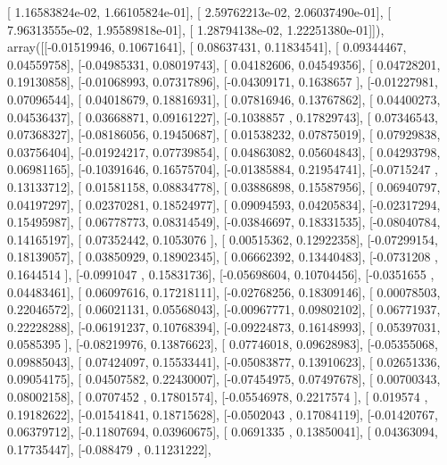 \documentclass{article}
\begin{document}
       [  1.16583824e-02,   1.66105824e-01],
       [  2.59762213e-02,   2.06037490e-01],
       [  7.96313555e-02,   1.95589818e-01],
       [  1.28794138e-02,   1.22251380e-01]]), array([[-0.01519946,  0.10671641],
       [ 0.08637431,  0.11834541],
       [ 0.09344467,  0.04559758],
       [-0.04985331,  0.08019743],
       [ 0.04182606,  0.04549356],
       [ 0.04728201,  0.19130858],
       [-0.01068993,  0.07317896],
       [-0.04309171,  0.1638657 ],
       [-0.01227981,  0.07096544],
       [ 0.04018679,  0.18816931],
       [ 0.07816946,  0.13767862],
       [ 0.04400273,  0.04536437],
       [ 0.03668871,  0.09161227],
       [-0.1038857 ,  0.17829743],
       [ 0.07346543,  0.07368327],
       [-0.08186056,  0.19450687],
       [ 0.01538232,  0.07875019],
       [ 0.07929838,  0.03756404],
       [-0.01924217,  0.07739854],
       [ 0.04863082,  0.05604843],
       [ 0.04293798,  0.06981165],
       [-0.10391646,  0.16575704],
       [-0.01385884,  0.21954741],
       [-0.0715247 ,  0.13133712],
       [ 0.01581158,  0.08834778],
       [ 0.03886898,  0.15587956],
       [ 0.06940797,  0.04197297],
       [ 0.02370281,  0.18524977],
       [ 0.09094593,  0.04205834],
       [-0.02317294,  0.15495987],
       [ 0.06778773,  0.08314549],
       [-0.03846697,  0.18331535],
       [-0.08040784,  0.14165197],
       [ 0.07352442,  0.1053076 ],
       [ 0.00515362,  0.12922358],
       [-0.07299154,  0.18139057],
       [ 0.03850929,  0.18902345],
       [ 0.06662392,  0.13440483],
       [-0.0731208 ,  0.1644514 ],
       [-0.0991047 ,  0.15831736],
       [-0.05698604,  0.10704456],
       [-0.0351655 ,  0.04483461],
       [ 0.06097616,  0.17218111],
       [-0.02768256,  0.18309146],
       [ 0.00078503,  0.22046572],
       [ 0.06021131,  0.05568043],
       [-0.00967771,  0.09802102],
       [ 0.06771937,  0.22228288],
       [-0.06191237,  0.10768394],
       [-0.09224873,  0.16148993],
       [ 0.05397031,  0.0585395 ],
       [-0.08219976,  0.13876623],
       [ 0.07746018,  0.09628983],
       [-0.05355068,  0.09885043],
       [ 0.07424097,  0.15533441],
       [-0.05083877,  0.13910623],
       [ 0.02651336,  0.09054175],
       [ 0.04507582,  0.22430007],
       [-0.07454975,  0.07497678],
       [ 0.00700343,  0.08002158],
       [ 0.0707452 ,  0.17801574],
       [-0.05546978,  0.2217574 ],
       [ 0.019574  ,  0.19182622],
       [-0.01541841,  0.18715628],
       [-0.0502043 ,  0.17084119],
       [-0.01420767,  0.06379712],
       [-0.11807694,  0.03960675],
       [ 0.0691335 ,  0.13850041],
       [ 0.04363094,  0.17735447],
       [-0.088479  ,  0.11231222],
\end{document}
